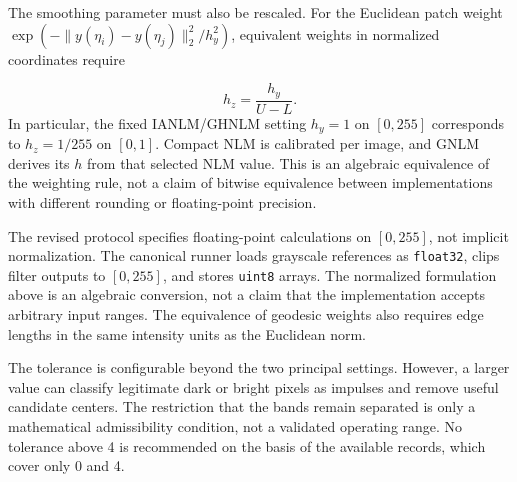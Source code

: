 \documentclass[pdflatex,iicol,sn-mathphys-num]{sn-jnl}
\newif\ifshowportuguese
\newcommand{\pt}[1]{\ifshowportuguese\par\begingroup\small\color{blue!55!black}\noindent\textbf{PT: }#1\par\endgroup\fi}
\begin{document}
The smoothing parameter must also be rescaled. For the Euclidean patch weight $\exp(-\lVert y(\eta_i)-y(\eta_j)\rVert_2^2/h_y^2)$, equivalent weights in normalized coordinates require
\pt{O parâmetro de suavização também deve ser reescalado. Para o peso Euclidiano entre patches $\exp(-\lVert y(\eta_i)-y(\eta_j)\rVert_2^2/h_y^2)$, pesos equivalentes em coordenadas normalizadas exigem}
\begin{equation}
h_z=\frac{h_y}{U-L}.
\label{eq:h_range_conversion}
\end{equation}
In particular, the fixed IANLM/GHNLM setting $h_y=1$ on $[0,255]$ corresponds to $h_z=1/255$ on $[0,1]$. Compact NLM is calibrated per image, and GNLM derives its $h$ from that selected NLM value. This is an algebraic equivalence of the weighting rule, not a claim of bitwise equivalence between implementations with different rounding or floating-point precision.
\pt{Em particular, a configuração fixa de IANLM/GHNLM $h_y=1$ em $[0,255]$ corresponde a $h_z=1/255$ em $[0,1]$. O NLM compacto é calibrado por imagem, e o GNLM deriva seu $h$ desse valor NLM selecionado. Essa é uma equivalência algébrica da regra de ponderação, e não uma afirmação de equivalência bit a bit entre implementações com diferentes arredondamentos ou precisões de ponto flutuante.}

The revised protocol specifies floating-point calculations on $[0,255]$, not implicit normalization. The canonical runner loads grayscale references as \texttt{float32}, clips filter outputs to $[0,255]$, and stores \texttt{uint8} arrays. The normalized formulation above is an algebraic conversion, not a claim that the implementation accepts arbitrary input ranges. The equivalence of geodesic weights also requires edge lengths in the same intensity units as the Euclidean norm.
\pt{O protocolo revisado especifica cálculos em ponto flutuante em $[0,255]$, e não normalização implícita. O executor canônico carrega referências em tons de cinza como \texttt{float32}, limita as saídas dos filtros a $[0,255]$ e armazena arrays \texttt{uint8}. A formulação normalizada acima é uma conversão algébrica, e não uma afirmação de que a implementação aceite faixas de entrada arbitrárias. A equivalência dos pesos geodésicos também exige comprimentos de arestas nas mesmas unidades de intensidade da norma Euclidiana.}


The tolerance is configurable beyond the two principal settings. However, a larger value can classify legitimate dark or bright pixels as impulses and remove useful candidate centers. The restriction that the bands remain separated is only a mathematical admissibility condition, not a validated operating range. No tolerance above 4 is recommended on the basis of the available records, which cover only 0 and 4.
\pt{A tolerância é configurável além das duas configurações principais. Entretanto, um valor maior pode classificar pixels escuros ou claros legítimos como impulsos e remover centros de candidatos úteis. A restrição de que as faixas permaneçam separadas é apenas uma condição matemática de admissibilidade, não uma faixa operacional validada. Nenhuma tolerância acima de 4 é recomendada com base nos registros experimentais disponíveis, que cobrem apenas 0 e 4.}
\end{document}
